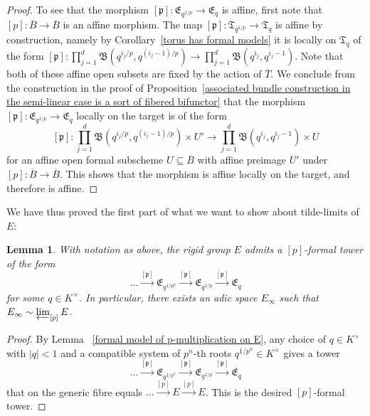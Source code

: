 \documentclass[10pt,oneside]{amsart}
\newtheorem{lemma}[theorem]{Lemma}
\theoremstyle{definition}
\begin{document}
\begin{proof}
		To see that the morphism $[\mathfrak p]:\mathfrak E_{q^{1/p}} \rightarrow  \mathfrak E_{q}$ is affine, first note that $[p]:\overline{B}\rightarrow \overline{B}$ is an affine morphism. The map $[\mathfrak p]:\mathfrak T_{q^{1/p}}\rightarrow \mathfrak T_{q}$ is affine by construction, namely by Corollary~\ref{torus has formal models} it is locally on $\mathfrak T_{q}$ of the form $[\mathfrak p]:\prod_{j=1}^d \mathfrak B(q^{i_j/p},q^{(i_j-1)/p})\rightarrow \prod_{j=1}^d \mathfrak B(q^{i_j},q^{i_j-1})$. Note that both of these affine open subsets are fixed by the action of $\overline{T}$.
		We conclude from the construction in the proof of Proposition~\ref{associated bundle construction in the semi-linear case is a sort of fibered bifunctor} that the morphism  $[\mathfrak p]:\mathfrak E_{q^{1/p}} \rightarrow  \mathfrak E_{q}$ locally on the target is of the form
		\[[\mathfrak p]:\prod_{j=1}^d \mathfrak B(q^{i_j/p},q^{(i_j-1)/p}) \times U' \rightarrow \prod_{j=1}^d \mathfrak B(q^{i_j},q^{i_j-1}) \times U\]
		for an affine open formal subscheme $U\subseteq \overline{B}$ with affine preimage $U'$ under $[p]:\overline{B}\rightarrow \overline{B}$. This shows that the morphism is affine locally on the target, and therefore is affine.
	\end{proof}
	
	We have thus proved the first part of what we want to show about tilde-limits of $E$:
	\begin{lemma}\label{p-formal tower exists for E}
		 With notation as above, the rigid group $E$ admits a $[p]$-formal tower of the form
		\[\dots \xrightarrow{[\mathfrak p]} \mathfrak E_{q^{1/p^2}}\xrightarrow{[\mathfrak p]} \mathfrak E_{q^{1/p}}\xrightarrow{[\mathfrak p]} \mathfrak E_q\]
		for some $q\in K^\times$. In particular, there exists an adic space $E_\infty$ such that $E_\infty\sim \varprojlim_{[p]}E$.
	\end{lemma}
	\begin{proof}
		By Lemma ~\ref{formal model of p-multiplication on E}, any choice of $q\in K^\times$ with $|q|<1$ and a compatible system of $p^n$-th roots $q^{1/p^n}\in K^\times$ gives a tower
		\[\dots \xrightarrow{[\mathfrak p]} \mathfrak E_{q^{1/p^2}}\xrightarrow{[\mathfrak p]} \mathfrak E_{q^{1/p}}\xrightarrow{[\mathfrak p]} \mathfrak E_q\]
		that on the generic fibre equals $\dots\xrightarrow{[p]} E\xrightarrow{[p]} E$. This is the desired $[p]$-formal tower.
	\end{proof}
	
\end{document}
